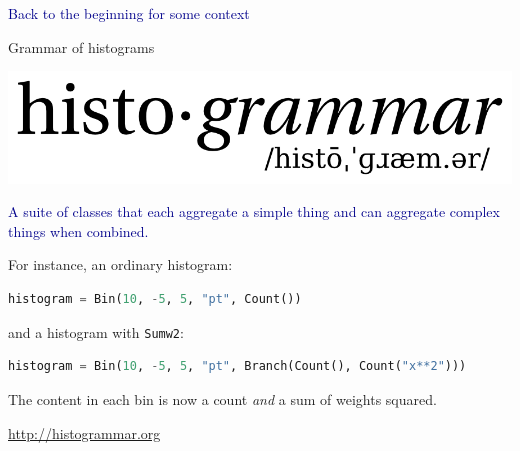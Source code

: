 \documentclass{beamer}
\begin{document}
\begin{frame}{}
\begin{center}
\textcolor{darkblue}{\Large Back to the beginning for some context}
\end{center}
\end{frame}

\begin{frame}[fragile]{Grammar of histograms}
\vspace{0.5 cm}
\begin{center}
\includegraphics[width=0.5\linewidth]{histogrammar-logo.png}
\end{center}

\textcolor{darkblue}{A suite of classes that each aggregate a simple thing and can aggregate complex things when combined.}

\vspace{0.35 cm}
For instance, an ordinary histogram:

\begin{lstlisting}[language=python]
histogram = Bin(10, -5, 5, "pt", Count())
\end{lstlisting}

and a histogram with {\tt\small Sumw2}:

\begin{lstlisting}[language=python]
histogram = Bin(10, -5, 5, "pt", Branch(Count(), Count("x**2")))
\end{lstlisting}

The content in each bin is now a count {\it and} a sum of weights squared.

\begin{center}
\textcolor{darkblue}{\url{http://histogrammar.org}}
\end{center}
\end{frame}
\end{document}
